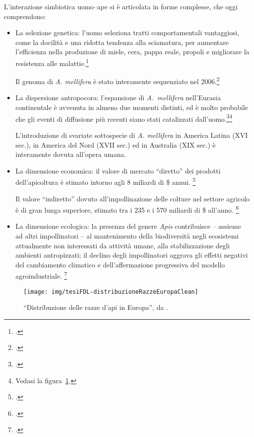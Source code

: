 L'interazione simbiotica uomo--ape si è articolata in forme complesse, che oggi comprendono:
\begin{itemize}
    \item La selezione genetica: l'uomo seleziona tratti comportamentali vantaggiosi, come la docilità e una ridotta
        tendenza alla sciamatura, per aumentare l’efficienza nella produzione di miele, cera, pappa reale, propoli
        e migliorare la resistenza alle malattie.\footcite{behavGenetics,algerianHoney}

        Il genoma di \emph{A. mellifera} è stato interamente sequenziato nel 2006.\footcite{genomeSeq}
    \item La dispersione antropocora: l'espansione di \emph{A.~mellifera} nell'Eurasia continentale è avvenuta in
        almeno due momenti distinti, ed è molto probabile che gli eventi di diffusione più recenti
        siano stati catalizzati dall'uomo.\footcite{antropocora}\footnote{Vedasi la figura~\ref{img:europ}.}

        L'introduzione di svariate sottospecie di \emph{A. mellifera} in America Latina (XVI sec.), in America
        del Nord (XVII sec.) ed in Australia (XIX sec.) è interamente dovuta all'opera umana.
    \item La dimensione economica: il valore di mercato ``diretto'' dei prodotti dell'apicoltura è stimato intorno agli 8 miliardi di \$ annui. \footcite{honeymarket1}

        Il valore ``indiretto'' dovuto all'impollinazione delle colture nel settore agricolo è di gran lunga superiore, stimato tra i 235 e i 570 miliardi di \$ all'anno. \footcite{honeymarket2,honeymarket3}
    \item La dimensione ecologica: la presenza del genere \emph{Apis} contribuisce -- assieme ad altri impollinatori -- al mantenimento della biodiversità negli ecosistemi attualmente non interessati da attività umane, alla stabilizzazione degli ambienti antropizzati; il declino degli impollinatori aggrava gli effetti negativi del cambiamento climatico e dell'affermazione progressiva del modello agroindustriale. \footcite{decline}
\end{itemize}

\begin{figure}[hbp]
    \centering
    \texttt{[image: img/tesiFDL-distribuzioneRazzeEuropaClean]}

    \caption[Distribuzione delle razze d'api in Europa]{``Distribuzione
    delle razze d'api in Europa'', da \cite[24]{tesiFDL}.}
    \label{img:europ}
\end{figure}

